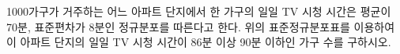 \noindent\begin{minipage}[t]{0.58\linewidth}\vspace{0pt}\raggedright 1000가구가 거주하는 어느 아파트 단지에서 한 가구의 일일 TV 시청 시간은 평균이 70분, 표준편차가 8분인 정규분포를 따른다고 한다. 위의 표준정규분포표를 이용하여 이 아파트 단지의 일일 TV 시청 시간이 86분 이상 90분 이하인 가구 수를 구하시오.\end{minipage}\hfill\begin{minipage}[t]{0.4\linewidth}\vspace{0pt}\centering \resizebox{\ifdim\width>\linewidth\linewidth\else\width\fi}{!}{}\end{minipage}\par
